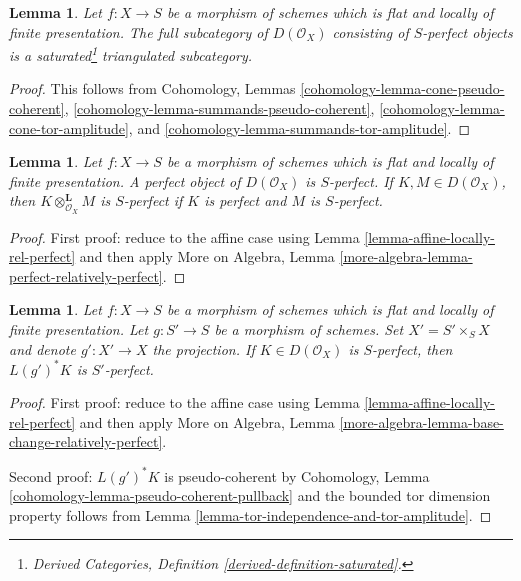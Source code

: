 \documentclass{stacks-project}
\theoremstyle{plain}
\newtheorem{lemma}[subsection]{Lemma}
\theoremstyle{definition}
\theoremstyle{remark}
\numberwithin{equation}{subsection}
\begin{document}
\begin{lemma}
\label{lemma-triangulated}
Let $f : X \to S$ be a morphism of schemes which is
flat and locally of finite presentation. The full subcategory
of $D(\mathcal{O}_X)$ consisting of $S$-perfect objects is
a saturated\footnote{Derived Categories, Definition
\ref{derived-definition-saturated}.} triangulated subcategory.
\end{lemma}

\begin{proof}
This follows from Cohomology, Lemmas
\ref{cohomology-lemma-cone-pseudo-coherent},
\ref{cohomology-lemma-summands-pseudo-coherent},
\ref{cohomology-lemma-cone-tor-amplitude}, and
\ref{cohomology-lemma-summands-tor-amplitude}.
\end{proof}

\begin{lemma}
\label{lemma-perfect-relatively-perfect}
Let $f : X \to S$ be a morphism of schemes which is flat and locally
of finite presentation. A perfect object of $D(\mathcal{O}_X)$ is $S$-perfect.
If $K, M \in D(\mathcal{O}_X)$, then $K \otimes_{\mathcal{O}_X}^\mathbf{L} M$
is $S$-perfect if $K$ is perfect and $M$ is $S$-perfect.
\end{lemma}

\begin{proof}
First proof: reduce to the affine case using
Lemma \ref{lemma-affine-locally-rel-perfect}
and then apply More on Algebra, Lemma
\ref{more-algebra-lemma-perfect-relatively-perfect}.
\end{proof}

\begin{lemma}
\label{lemma-base-change-relatively-perfect}
Let $f : X \to S$ be a morphism of schemes which is flat and
locally of finite presentation.
Let $g : S' \to S$ be a morphism of schemes. Set $X' = S' \times_S X$
and denote $g' : X' \to X$ the projection.
If $K \in D(\mathcal{O}_X)$ is $S$-perfect, then $L(g')^*K$
is $S'$-perfect.
\end{lemma}

\begin{proof}
First proof: reduce to the affine case using
Lemma \ref{lemma-affine-locally-rel-perfect}
and then apply More on Algebra, Lemma
\ref{more-algebra-lemma-base-change-relatively-perfect}.

\medskip\noindent
Second proof: $L(g')^*K$ is pseudo-coherent by
Cohomology, Lemma \ref{cohomology-lemma-pseudo-coherent-pullback}
and the bounded tor dimension property follows from
Lemma \ref{lemma-tor-independence-and-tor-amplitude}.
\end{proof}
\end{document}
